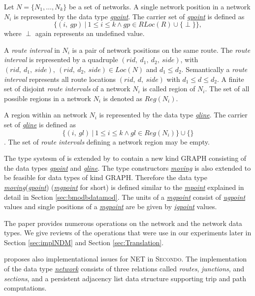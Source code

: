\documentclass[a4paper]{article}
\newcommand{\secondo}{\textsc{Secondo}}
\newcommand{\dt}[1]{\textsl{\underline{#1}}}
\begin{document}
Let $N=\{N_1,\ldots,N_k\}$ be a set of networks. A single network position in a
network $N_i$ is represented by the data type \dt{gpoint}. The carrier set of
\dt{gpoint} is defined as
\[\{(i,\ gp)\ |\ 1 \leq i \leq k \wedge gp \in RLoc(R) \cup \{ \perp \}\},\]
where $\perp$ again represents an undefined value.

A \textit{route interval} in $N_i$ is a pair of network positions on the same
route. 
The \textit{route interval} is represented by a quadruple $(rid,\ d_1,\ d_2,\
side)$, with
$(rid,\ d_1,\ side),\ (rid,\ d_2,\ side) \in Loc(N)$
and $d_1 \leq d_2$. Semantically
a \textit{route interval} represents all route locations $(rid,\ d,\ side)$ with
$d_1 \leq d \leq d_2$. A finite set of disjoint \textit{route intervals} of a
network
$N_i$ is called region of $N_i$. The set of all possible regions in a network
$N_i$ is
denoted as $Reg(N_i)$.

A region within an network $N_i$ is represented by the data type \dt{gline}.
The carrier set of \dt{gline} is defined as
\[\{(i,\ gl)\ |\ 1 \leq i \leq k \wedge gl \in Reg(N_i) \} \cup \{\}\].
The set of \textit{route intervals} defining a network region may be empty.

The type systesm of \cite{RepresentingMovingObjectsGueting} is extended by
\cite{NetworkGueting} to contain a new kind GRAPH consisting of the data types
\dt{gpoint} and \dt{gline}. The type constructors \dt{moving} is also extended
to be feasible for data types of kind GRAPH. Therefore the data type
\dt{moving}(\dt{gpoint}) (\dt{mgpoint} for short) is defined similar to the
\dt{mpoint} explained in detail in Section \ref{sec:bmodbdatamod}. The units of
a \dt{mgpoint} consist of \dt{ugpoint} values and single positions of a
\dt{mgpoint} are be given by \dt{igpoint} values.

The paper provides numerous operations on the network and the network data
types.
We give reviews of the operations that were use in our experiments later in
Section \ref{sec:implNDM} and Section \ref{sec:Translation}.

\cite{NetworkGueting} proposes also implementational issues for NET in
\secondo{}. The implementation of the data type \dt{network} consists of three
relations called \textit{routes}, \textit{junctions}, and \textit{sections}, and a persistent
adjacency
list data structure supporting trip and path computations.
\end{document}
